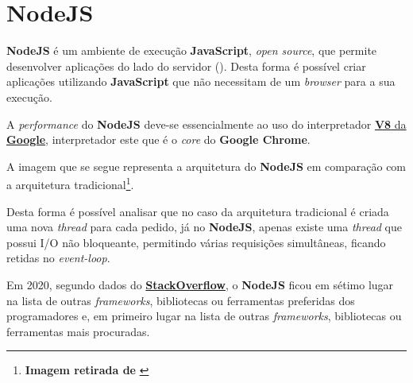 \section{NodeJS}

\begin{minipage}{.3\textwidth}
\end{minipage}
\begin{minipage}{.7\textwidth}
	\minipagerestore
	\textbf{NodeJS} é um ambiente de execução \textbf{JavaScript}, \textit{open source}, que permite desenvolver aplicações do lado do servidor (). Desta forma é possível criar aplicações utilizando \textbf{JavaScript} que não necessitam de um \textit{browser} para a sua execução.

	A \textit{performance} do \textbf{NodeJS} deve-se essencialmente ao uso do interpretador \href{https://v8.dev}{\textbf{V8} da \textbf{Google}}, interpretador este que é o \textit{core} do \textbf{Google Chrome}.

\end{minipage}

A imagem que se segue representa a arquitetura do \textbf{NodeJS} em comparação com a arquitetura tradicional\footnote{\textbf{Imagem retirada de} \cite{caseByCaseNode}}.


Desta forma é possível analisar que no caso da arquitetura tradicional é criada uma nova \textit{thread} para cada pedido, já no \textbf{NodeJS}, apenas existe uma \textit{thread} que possui I/O não bloqueante, permitindo várias requisições simultâneas, ficando retidas no \textit{event-loop}.

Em 2020, segundo dados do \href{https://insights.stackoverflow.com/survey/2020#technology-most-loved-dreaded-and-wanted-other-frameworks-libraries-and-tools-loved3}{\textbf{StackOverflow}}, o \textbf{NodeJS} ficou em sétimo lugar na lista de outras \textit{frameworks}, bibliotecas ou ferramentas preferidas dos programadores e, em primeiro lugar na lista de outras \textit{frameworks}, bibliotecas ou ferramentas mais procuradas.
